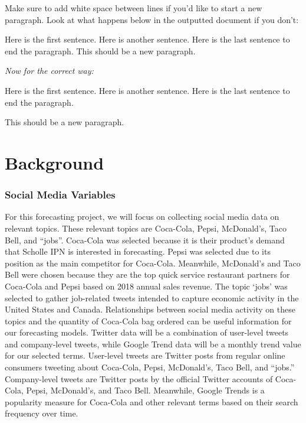 \documentclass[12pt,oneside]{chicagocapstone}
\begin{document}
Make sure to add white space between lines if you'd like to start a new
paragraph. Look at what happens below in the outputted document if you
don't:

Here is the first sentence. Here is another sentence. Here is the last
sentence to end the paragraph. This should be a new paragraph.

\emph{Now for the correct way:}

Here is the first sentence. Here is another sentence. Here is the last
sentence to end the paragraph.

This should be a new paragraph.

\chapter*{Background}\label{background}

\subsection*{Social Media Variables}\label{social-media-variables}

For this forecasting project, we will focus on collecting social media
data on relevant topics. These relevant topics are Coca-Cola, Pepsi,
McDonald's, Taco Bell, and ``jobs''. Coca-Cola was selected because it
is their product's demand that Scholle IPN is interested in forecasting.
Pepsi was selected due to its position as the main competitor for
Coca-Cola. Meanwhile, McDonald's and Taco Bell were chosen because they
are the top quick service restaurant partners for Coca-Cola and Pepsi
based on 2018 annual sales revenue. The topic `jobs' was selected to
gather job-related tweets intended to capture economic activity in the
United States and Canada. Relationships between social media activity on
these topics and the quantity of Coca-Cola bag ordered can be useful
information for our forecasting models. Twitter data will be a
combination of user-level tweets and company-level tweets, while Google
Trend data will be a monthly trend value for our selected terms.
User-level tweets are Twitter posts from regular online consumers
tweeting about Coca-Cola, Pepsi, McDonald's, Taco Bell, and ``jobs.''
Company-level tweets are Twitter posts by the official Twitter accounts
of Coca-Cola, Pepsi, McDonald's, and Taco Bell. Meanwhile, Google Trends
is a popularity measure for Coca-Cola and other relevant terms based on
their search frequency over time.
\end{document}

